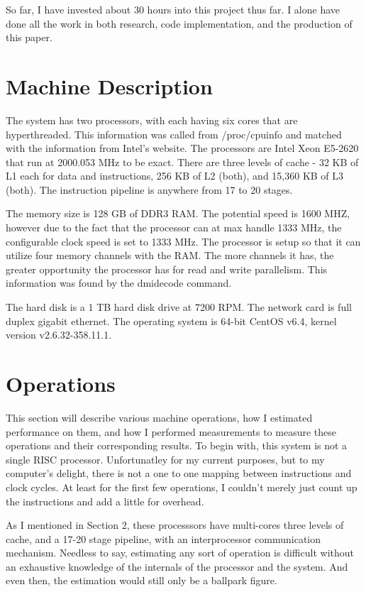\documentclass[paper=a4, fontsize=11pt]{scrartcl}
\numberwithin{equation}{section}        %
\numberwithin{figure}{section}          %
\numberwithin{table}{section}               %
\begin{document}
So far, I have invested about 30 hours into this project thus far.  I alone have done all the work in both research, code implementation, and the production of this paper.

\section{Machine Description}

The system has two processors, with each having six cores that are hyperthreaded.  This information was called from /proc/cpuinfo and matched with the information from Intel's website.  The processors are Intel Xeon E5-2620 that run at 2000.053 MHz to be exact.  There are three levels of cache - 32 KB of L1 each for data and instructions, 256 KB of L2 (both), and 15,360 KB of L3 (both).  The instruction pipeline is anywhere from 17 to 20 stages.

The memory size is 128 GB of DDR3 RAM.  The potential speed is 1600 MHZ, however due to the fact that the processor can at max handle 1333 MHz, the configurable clock speed is set to 1333 MHz.  The processor is setup so that it can utilize four memory channels with the RAM.  The more channels it has, the greater opportunity the processor has for read and write parallelism.  This information was found by the dmidecode command.

The hard disk is a 1 TB hard disk drive at 7200 RPM.  The network card is full duplex gigabit ethernet.  The operating system is 64-bit CentOS v6.4, kernel version v2.6.32-358.11.1.

\section{Operations}
This section will describe various machine operations, how I estimated performance on them, and how I performed measurements to measure these operations and their corresponding results.  To begin with, this system is not a single RISC processor.  Unfortunatley for my current purposes, but to my computer's delight, there is not a one to one mapping between instructions and clock cycles.  At least for the first few operations, I couldn't merely just count up the instructions and add a little for overhead.

As I mentioned in Section 2, these processsors have multi-cores three levels of cache, and a 17-20 stage pipeline, with an interprocessor communication mechanism.  Needless to say, estimating any sort of operation is difficult without an exhaustive knowledge of the internals of the processor and the system.  And even then, the estimation would still only be a ballpark figure.
\end{document}
